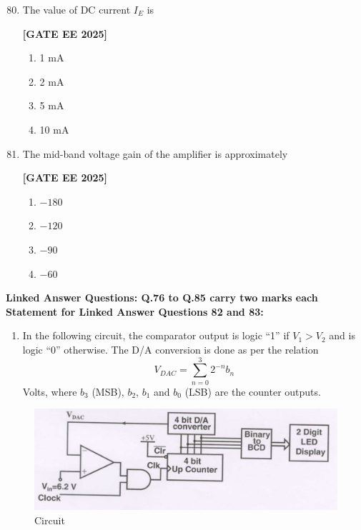 \documentclass[12pt]{article}
\begin{document}
\begin{enumerate}[leftmargin=*, label=\textbf{Q.\arabic*:}]
\setcounter{enumi}{79}

\item The value of DC current $I_E$ is
 
\noindent \textbf{[GATE EE 2025]}
\begin{enumerate}
  \item 1 mA
  \item 2 mA
  \item 5 mA
  \item 10 mA
\end{enumerate}

\item The mid-band voltage gain of the amplifier is approximately
 
\noindent \textbf{[GATE EE 2025]}
\begin{enumerate}
  \item $-180$
  \item $-120$
  \item $-90$
  \item $-60$
\end{enumerate}

\end{enumerate}


 \large \textbf {Linked Answer Questions: Q.76 to Q.85 carry two marks each}
 \large \textbf {Statement for Linked Answer Questions 82 and 83: }

\begin{enumerate}
\item In the following circuit, the comparator output is logic “1” if $V_1 > V_2$ and is logic “0” otherwise. The D/A conversion is done as per the relation
\[
V_{DAC} = \sum_{n=0}^3 2^{-n} b_n
\]
Volts, where $b_3$ (MSB), $b_2$, $b_1$ and $b_0$ (LSB) are the counter outputs.
\end{enumerate}
\begin{figure}[H]\centering
\includegraphics[width=0.6\columnwidth]{figs/q8283.png}
\caption{Circuit}
\label{fig:q8283}
\end{figure}
\end{document}
